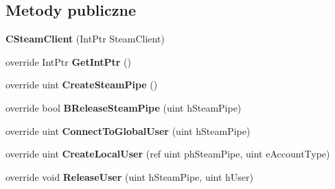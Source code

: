 \subsection*{Metody publiczne}
\begin{DoxyCompactItemize}
\item 
\mbox{\label{class_valve_1_1_steamworks_1_1_c_steam_client_af4b173016259cfbb19be79cca8c6faac}} 
{\bfseries C\+Steam\+Client} (Int\+Ptr Steam\+Client)
\item 
\mbox{\label{class_valve_1_1_steamworks_1_1_c_steam_client_a251252a843d8744b30be934854bd7672}} 
override Int\+Ptr {\bfseries Get\+Int\+Ptr} ()
\item 
\mbox{\label{class_valve_1_1_steamworks_1_1_c_steam_client_a8466282b9748692b2889884b649b1023}} 
override uint {\bfseries Create\+Steam\+Pipe} ()
\item 
\mbox{\label{class_valve_1_1_steamworks_1_1_c_steam_client_ae296769214255c0f85580bc68b0c1c11}} 
override bool {\bfseries B\+Release\+Steam\+Pipe} (uint h\+Steam\+Pipe)
\item 
\mbox{\label{class_valve_1_1_steamworks_1_1_c_steam_client_a792c4e32c0b656255abce6ae74efc448}} 
override uint {\bfseries Connect\+To\+Global\+User} (uint h\+Steam\+Pipe)
\item 
\mbox{\label{class_valve_1_1_steamworks_1_1_c_steam_client_afb8a9e7a7917f1ebe6fb4b4fbe4a89bf}} 
override uint {\bfseries Create\+Local\+User} (ref uint ph\+Steam\+Pipe, uint e\+Account\+Type)
\item 
\mbox{\label{class_valve_1_1_steamworks_1_1_c_steam_client_ab0b0d08fbcd6e60ecddc0f6768019aba}} 
override void {\bfseries Release\+User} (uint h\+Steam\+Pipe, uint h\+User)
\item 
\mbox{\label{class_valve_1_1_steamworks_1_1_c_steam_client_a0f9304edbd9859e3446b59c4fe2ad248}} 

\end{DoxyCompactItemize}
